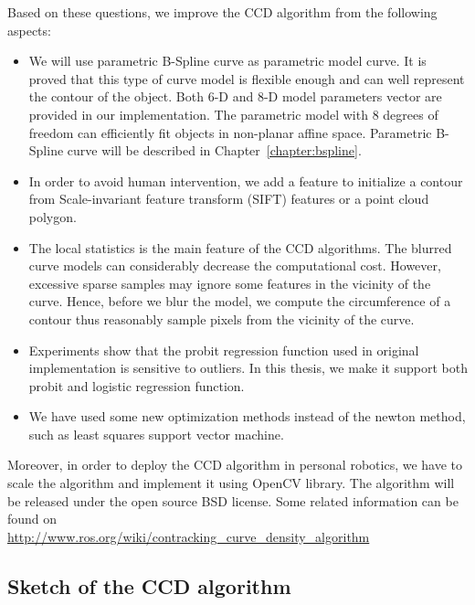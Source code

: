 Based on these questions, we improve the CCD algorithm from the
following aspects:
\begin{itemize}
\item We will use parametric B-Spline curve as
parametric model curve. It is proved that this type of curve model is
flexible enough and can well represent the contour of the
object. Both 6-D and 8-D model parameters vector
are provided in our implementation. The parametric model with 8
degrees of freedom can efficiently fit objects in non-planar affine
space. Parametric B-Spline curve will be described in
Chapter~\ref{chapter:bspline}.
\item In order to avoid human intervention, we add a feature to 
  initialize a contour from Scale-invariant feature transform (SIFT)
  features or a point cloud polygon.
\item The local statistics is the main feature of the CCD
  algorithms. The blurred curve models can considerably decrease the
  computational cost. However, excessive sparse samples may ignore some
  features in the vicinity of the curve. Hence, before we blur the
  model, we compute the circumference of a contour thus reasonably
  sample pixels from the vicinity of the curve.
\item Experiments show that the probit regression function used
  in original implementation is sensitive to outliers. In this
  thesis, we make it support both probit and logistic regression
  function.
\item We have used some new optimization methods instead of the
  newton method, such as least squares support vector machine.
\end{itemize}


Moreover, in order to deploy the CCD algorithm in personal robotics,
we have to scale the algorithm and implement it using OpenCV library.
The algorithm will be released under the open source BSD license. Some
related information can be found on\\
\url{http://www.ros.org/wiki/contracking\_curve\_density\_algorithm}

\subsection{Sketch of the CCD algorithm}
\label{sec:sccd}

